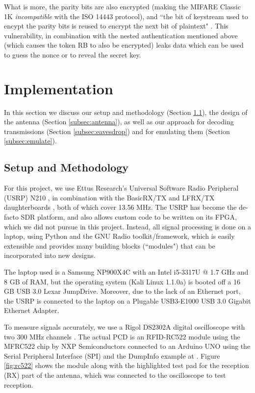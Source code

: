 \documentclass[fleqn,10pt]{SelfArx} %
\begin{document}
What is more, the parity bits are also encrypted (making the MIFARE Classic 1K {\em incompatible} with the ISO 14443 protocol), and ``the bit of keystream used to encypt the parity bits is reused to encrypt the next bit of plaintext" \cite{classicvulnerabilities}. This vulnerability, in combination with the nested authentication mentioned above (which causes the token RB to also be encrypted) leaks data which can be used to guess the nonce or to reveal the secret key.



\section{Implementation}
\label{sec:implementation}

In this section we discuss our setup and methodology (Section \ref{subsec:setup}), the design of the antenna (Section \ref{subsec:antenna}), as well as our approach for decoding transmissions (Section \ref{subsec:eavesdrop}) and for emulating them (Section \ref{subsec:emulate}).

\subsection{Setup and Methodology}
\label{subsec:setup}

For this project, we use Ettus Research's Universal Software Radio Peripheral (USRP) N210 \cite{usrp}, in combination with the BasicRX/TX and LFRX/TX daughterboards \cite{daughterboards}, both of which cover 13.56 MHz. The USRP has become the de-facto SDR platform, and also allows custom code to be written on its FPGA, which we did not pursue in this project. Instead, all signal processing is done on a laptop, using Python and the GNU Radio toolkit/framework, which is easily extensible and provides many building blocks (``modules") that can be incorporated into new designs.

The laptop used is a Samsung NP900X4C with an Intel i5-3317U @ 1.7 GHz and 8 GB of RAM, but the operating system (Kali Linux 1.1.0a) is booted off a 16 GB USB 3.0 Lexar JumpDrive. Moreover, due to the lack of an Ethernet port, the USRP is connected to the laptop on a Plugable USB3-E1000 USB 3.0 Gigabit Ethernet Adapter.


To measure signals accurately, we use a Rigol DS2302A digital oscilloscope with two 300 MHz channels \cite{rigol}. The actual PCD is an RFID-RC522 module using the MFRC522 chip by NXP Semiconductors \cite{mfrc522} connected to an Arduino UNO using the Serial Peripheral Interface (SPI) and the DumpInfo example at \cite{library}. Figure \ref{fig:rc522} shows the module along with the highlighted test pad for the reception (RX) part of the antenna, which was connected to the oscilloscope to test reception.
\end{document}
